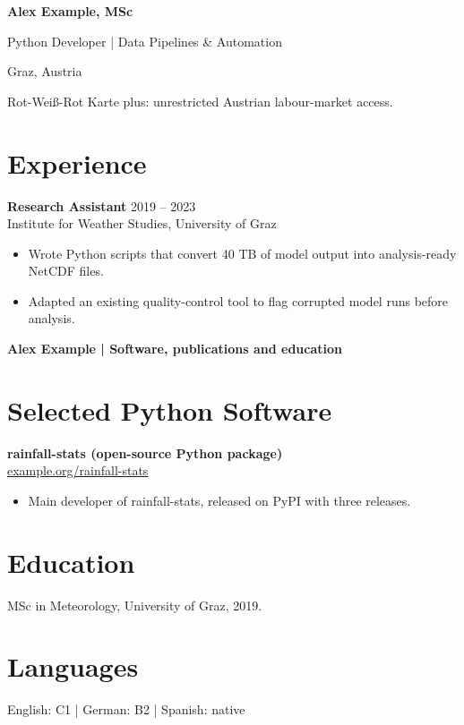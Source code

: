 \documentclass[10pt,a4paper]{article}
\begin{document}
\raggedright\setlength{\emergencystretch}{2em}
{\fontsize{28pt}{32pt}\selectfont\bfseries\color{ink} Alex Example, MSc}\par
\vspace{4pt}
{\fontsize{11pt}{14pt}\selectfont Python Developer | Data Pipelines \& Automation\par}
\vspace{4pt}
{\fontsize{11pt}{14pt}\selectfont
Graz, Austria\par}
\vspace{3pt}
{\fontsize{11pt}{14pt}\selectfont Rot-Weiß-Rot Karte plus: unrestricted Austrian labour-market access.\par}
\section{Experience}
\textbf{Research Assistant} \hfill 2019 – 2023\\Institute for Weather Studies, University of Graz
\begin{itemize}
\item Wrote Python scripts that convert 40 TB of model output into analysis-ready NetCDF files.
\item Adapted an existing quality-control tool to flag corrupted model runs before analysis.
\end{itemize}
\vspace{8pt}
{\large\bfseries Alex Example | Software, publications and education}
\section{Selected Python Software}
\textbf{rainfall-stats (open-source Python package)}\\
\href{https://example.org/rainfall-stats}{example.org/rainfall-stats}
\begin{itemize}
\item Main developer of rainfall-stats, released on PyPI with three releases.
\end{itemize}
\section{Education}
MSc in Meteorology, University of Graz, 2019.
\section{Languages}
English: C1 \enspace | \enspace German: B2 \enspace | \enspace Spanish: native
\end{document}

